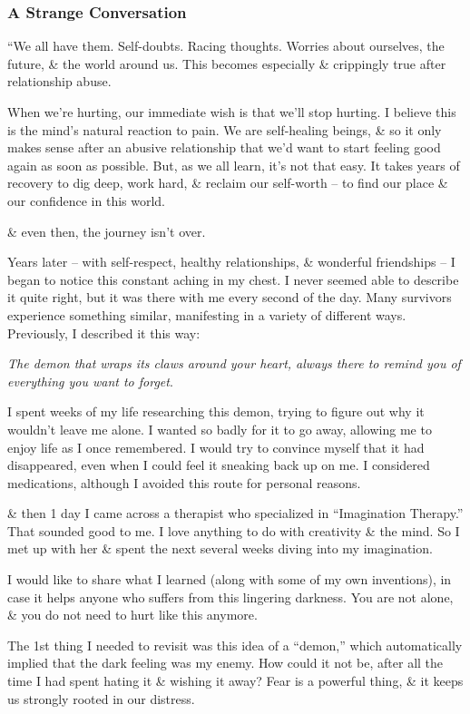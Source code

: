 \documentclass{article}
\numberwithin{equation}{section}
\begin{document}
\subsubsection{A Strange Conversation}
``We all have them. Self-doubts. Racing thoughts. Worries about ourselves, the future, \& the world around us. This becomes especially \& crippingly true after relationship abuse.

When we're hurting, our immediate wish is that we'll stop hurting. I believe this is the mind's natural reaction to pain. We are self-healing beings, \& so it only makes sense after an abusive relationship that we'd want to start feeling good again as soon as possible. But, as we all learn, it's not that easy. It takes years of recovery to dig deep, work hard, \& reclaim our self-worth -- to find our place \& our confidence in this world.

\& even then, the journey isn't over.

Years later -- with self-respect, healthy relationships, \& wonderful friendships -- I began to notice this constant aching in my chest. I never seemed able to describe it quite right, but it was there with me every second of the day. Many survivors experience something similar, manifesting in a variety of different ways. Previously, I described it this way:

\textit{The demon that wraps its claws around your heart, always there to remind you of everything you want to forget}.

I spent weeks of my life researching this demon, trying to figure out why it wouldn't leave me alone. I wanted so badly for it to go away, allowing me to enjoy life as I once remembered. I would try to convince myself that it had disappeared, even when I could feel it sneaking back up on me. I considered medications, although I avoided this route for personal reasons.

\& then 1 day I came across a therapist who specialized in ``Imagination Therapy.'' That sounded good to me. I love anything to do with creativity \& the mind. So I met up with her \& spent the next several weeks diving into my imagination.

I would like to share what I learned (along with some of my own inventions), in case it helps anyone who suffers from this lingering darkness. You are not alone, \& you do not need to hurt like this anymore.

The 1st thing I needed to revisit was this idea of a ``demon,'' which automatically implied that the dark feeling was my enemy. How could it not be, after all the time I had spent hating it \& wishing it away? Fear is a powerful thing, \& it keeps us strongly rooted in our distress.
\end{document}
